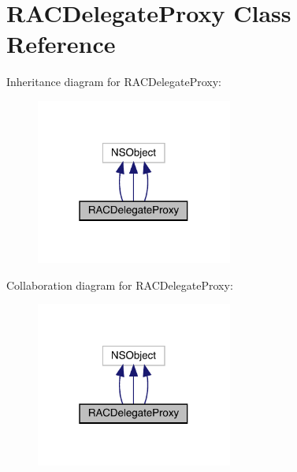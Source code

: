 \hypertarget{interface_r_a_c_delegate_proxy}{}\section{R\+A\+C\+Delegate\+Proxy Class Reference}
\label{interface_r_a_c_delegate_proxy}


Inheritance diagram for R\+A\+C\+Delegate\+Proxy\+:\nopagebreak
\begin{figure}[H]
\begin{center}
\leavevmode
\includegraphics[width=183pt]{interface_r_a_c_delegate_proxy__inherit__graph}
\end{center}
\end{figure}


Collaboration diagram for R\+A\+C\+Delegate\+Proxy\+:\nopagebreak
\begin{figure}[H]
\begin{center}
\leavevmode
\includegraphics[width=183pt]{interface_r_a_c_delegate_proxy__coll__graph}
\end{center}
\end{figure}
